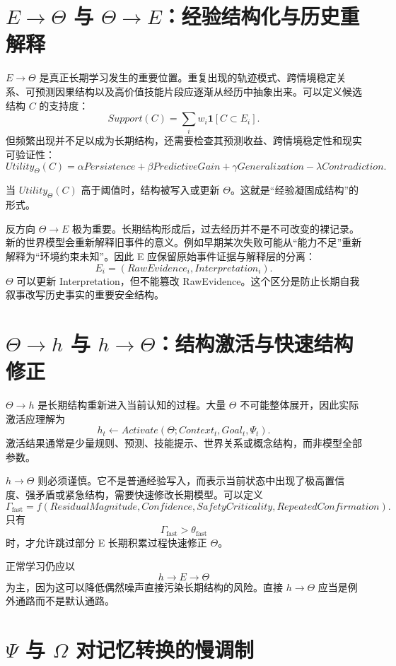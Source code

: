 \section{$E\rightarrow\Theta$ 与 $\Theta\rightarrow E$：经验结构化与历史重解释}

$E\rightarrow\Theta$ 是真正长期学习发生的重要位置。重复出现的轨迹模式、跨情境稳定关系、可预测因果结构以及高价值技能片段应逐渐从经历中抽象出来。可以定义候选结构 $C$ 的支持度：
\[
Support(C)
=
\sum_i
w_i\mathbf 1[C\subset E_i].
\]
但频繁出现并不足以成为长期结构，还需要检查其预测收益、跨情境稳定性和现实可验证性：
\[
Utility_\Theta(C)
=
\alpha Persistence
+\beta PredictiveGain
+\gamma Generalization
-\lambda Contradiction.
\]

当 $Utility_\Theta(C)$ 高于阈值时，结构被写入或更新 $\Theta$。这就是“经验凝固成结构”的形式。

反方向 $\Theta\rightarrow E$ 极为重要。长期结构形成后，过去经历并不是不可改变的裸记录。新的世界模型会重新解释旧事件的意义。例如早期某次失败可能从“能力不足”重新解释为“环境约束未知”。因此 E 应保留原始事件证据与解释层的分离：
\[
E_i=(RawEvidence_i,Interpretation_i).
\]
$\Theta$ 可以更新 Interpretation，但不能篡改 RawEvidence。这个区分是防止长期自我叙事改写历史事实的重要安全结构。

\section{$\Theta\rightarrow h$ 与 $h\rightarrow\Theta$：结构激活与快速结构修正}

$\Theta\rightarrow h$ 是长期结构重新进入当前认知的过程。大量 $\Theta$ 不可能整体展开，因此实际激活应理解为
\[
h_t
\leftarrow
Activate(\Theta;Context_t,Goal_t,\Psi_t).
\]
激活结果通常是少量规则、预测、技能提示、世界关系或概念结构，而非模型全部参数。

$h\rightarrow\Theta$ 则必须谨慎。它不是普通经验写入，而表示当前状态中出现了极高置信度、强矛盾或紧急结构，需要快速修改长期模型。可以定义
\[
\Gamma_{\mathrm{fast}}
=
f(
ResidualMagnitude,
Confidence,
SafetyCriticality,
RepeatedConfirmation
).
\]
只有
\[
\Gamma_{\mathrm{fast}}>\theta_{\mathrm{fast}}
\]
时，才允许跳过部分 E 长期积累过程快速修正 $\Theta$。

正常学习仍应以
\[
h\rightarrow E\rightarrow\Theta
\]
为主，因为这可以降低偶然噪声直接污染长期结构的风险。直接 $h\rightarrow\Theta$ 应当是例外通路而不是默认通路。

\section{$\Psi$ 与 $\Omega$ 对记忆转换的慢调制}

